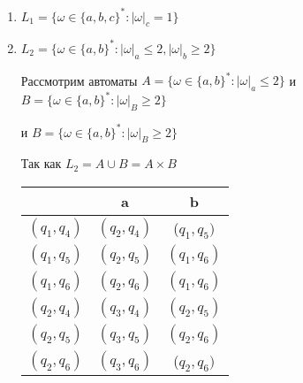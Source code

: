 \documentclass{article}
\begin{document}
    \begin{enumerate}
        \item \(L_1=\{\omega\in\{a,b,c\}^* : |\omega|_c = 1 \} \)
        \begin{center}
            \begin{figure}[htbp]
                \centering
                
            \end{figure}
        \end{center}

     \item \(L_2=\{\omega\in\{a,b\}^* : |\omega|_a \leqslant 2, |\omega|_b \geqslant 2 \} \)
     
     Рассмотрим автоматы 
     \(A=\{\omega\in\{a,b\}^* : |\omega|_a \leqslant 2 \} \) 
     и 
     \(B=\{\omega\in\{a,b\}^* : |\omega|_B \geqslant 2 \} \)
        \begin{center}
            \begin{figure}[htbp]
                \centering
                
            \end{figure}
        \end{center}
    и 
    \(B=\{\omega\in\{a,b\}^* : |\omega|_B \geqslant 2 \} \)
        \begin{center}
            \begin{figure}[htbp]
                \centering
                
            \end{figure}
        \end{center}
    Так как \(L_2 = A \cup B = A \times B \)
    \begin{center}
        \begin{tabular} {|c|c|c|}
            \hline
             & a & b \\
            \hline
            \((q_1,q_4)\) & \((q_2,q_4)\) & (\(q_1,q_5)\) \\
            \hline
            \((q_1,q_5)\) & \((q_2,q_5)\) & \((q_1,q_6)\) \\
            \hline
            \((q_1,q_6)\) & \((q_2,q_6)\) & \((q_1,q_6)\) \\
            \hline
            \((q_2,q_4)\) & \((q_3,q_4)\) & \((q_2,q_5)\) \\
            \hline
            \((q_2,q_5)\) & \((q_3,q_5)\) & \((q_2,q_6)\) \\
            \hline
            \((q_2,q_6)\) & \((q_3,q_6)\) & (\(q_2,q_6)\) \\

\end{tabular}
\end{center}
\end{enumerate}
\end{document}
